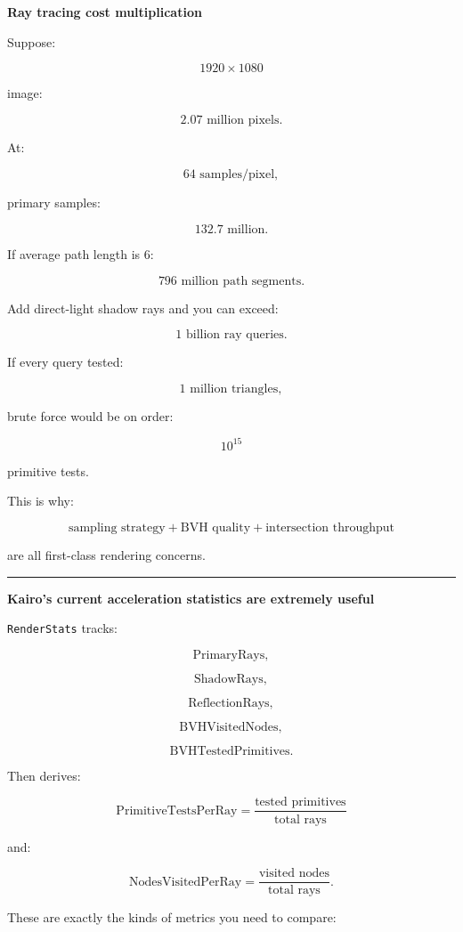 \textbf{Ray tracing cost multiplication}

Suppose:

\[
1920\times1080
\]

image:

\[
2.07\text{ million pixels}.
\]

At:

\[
64\text{ samples/pixel},
\]

primary samples:

\[
132.7\text{ million}.
\]

If average path length is 6:

\[
796\text{ million path segments}.
\]

Add direct-light shadow rays and you can exceed:

\[
1\text{ billion ray queries}.
\]

If every query tested:

\[
1\text{ million triangles},
\]

brute force would be on order:

\[
10^{15}
\]

primitive tests.

This is why:

\[
\boxed{
\text{sampling strategy}
+
\text{BVH quality}
+
\text{intersection throughput}
}
\]

are all first-class rendering concerns.

\begin{center}\rule{0.5\linewidth}{0.5pt}\end{center}

\textbf{Kairo's current acceleration statistics are extremely useful}

\texttt{RenderStats} tracks:

\[
\text{PrimaryRays},
\]

\[
\text{ShadowRays},
\]

\[
\text{ReflectionRays},
\]

\[
\text{BVHVisitedNodes},
\]

\[
\text{BVHTestedPrimitives}.
\]

Then derives:

\[
\boxed{
\text{PrimitiveTestsPerRay}
=
\frac{
\text{tested primitives}
}{
\text{total rays}
}
}
\]

and:

\[
\boxed{
\text{NodesVisitedPerRay}
=
\frac{
\text{visited nodes}
}{
\text{total rays}
}.
}
\]

These are exactly the kinds of metrics you need to compare:

